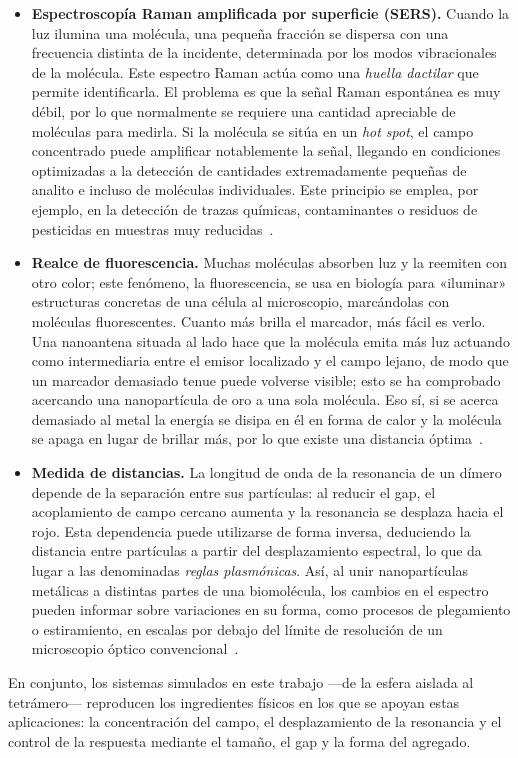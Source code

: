 \begin{itemize}
  \item \textbf{Espectroscopía Raman amplificada por superficie (SERS).}
        Cuando la luz ilumina una molécula, una pequeña fracción se dispersa
        con una frecuencia distinta de la incidente, determinada por los
        modos vibracionales de la molécula. Este espectro Raman actúa como
        una \emph{huella dactilar} que permite identificarla. El problema es
        que la señal Raman espontánea es muy débil, por lo que normalmente
        se requiere una cantidad apreciable de moléculas para medirla. Si la
        molécula se sitúa en un \emph{hot spot}, el campo concentrado puede
        amplificar notablemente la señal, llegando en condiciones optimizadas
        a la detección de cantidades extremadamente pequeñas de analito e
        incluso de moléculas individuales. Este principio se emplea, por
        ejemplo, en la detección de trazas químicas, contaminantes o residuos
        de pesticidas en muestras muy reducidas~\cite{Pilot2019}.

  \item \textbf{Realce de fluorescencia.} Muchas moléculas absorben luz y la
        reemiten con otro color; este fenómeno, la fluorescencia, se usa en
        biología para «iluminar» estructuras concretas de una célula al
        microscopio, marcándolas con moléculas fluorescentes. Cuanto más
        brilla el marcador, más fácil es verlo. Una nanoantena situada al lado
        hace que la molécula emita más luz 
        actuando como intermediaria entre el emisor localizado y el campo lejano, 
        de modo que un marcador demasiado tenue puede
        volverse visible; esto se ha comprobado acercando una nanopartícula de
        oro a una sola molécula. Eso sí, si se acerca demasiado al metal la
        energía se disipa en él en forma de calor y la molécula se apaga en
        lugar de brillar más, por lo que existe una distancia
        óptima~\cite{Kuhn2006}.

  \item \textbf{Medida de distancias.} La longitud de onda de la resonancia
        de un dímero depende de la separación entre sus partículas: al
        reducir el gap, el acoplamiento de campo cercano aumenta y la
        resonancia se desplaza hacia el rojo. Esta dependencia
        puede utilizarse de forma inversa, deduciendo la distancia entre
        partículas a partir del desplazamiento espectral, lo que da lugar a
        las denominadas \emph{reglas plasmónicas}. Así, al unir nanopartículas
        metálicas a distintas partes de una biomolécula, los cambios en el
        espectro pueden informar sobre variaciones en su forma, como
        procesos de plegamiento o estiramiento, en escalas por debajo del
        límite de resolución de un microscopio óptico convencional~\cite{Sonnichsen2005}.
\end{itemize}
 
En conjunto, los sistemas simulados en este trabajo —de la esfera aislada al
tetrámero— reproducen los ingredientes físicos en los que se apoyan estas
aplicaciones: la concentración del campo, el desplazamiento de la resonancia
y el control de la respuesta mediante el tamaño, el gap y la forma del
agregado.